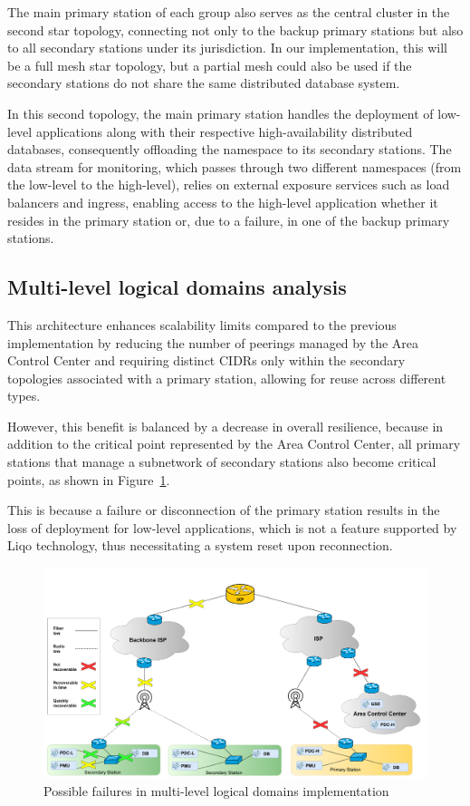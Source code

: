 The main primary station of each group also serves as the central cluster in the second star topology, connecting not only to the backup primary stations but also to all secondary stations under its jurisdiction. In our implementation, this will be a full mesh star topology, but a partial mesh could also be used if the secondary stations do not share the same distributed database system.

In this second topology, the main primary station handles the deployment of low-level applications along with their respective high-availability distributed databases, consequently offloading the namespace to its secondary stations. The data stream for monitoring, which passes through two different namespaces (from the low-level to the high-level), relies on external exposure services such as load balancers and ingress, enabling access to the high-level application whether it resides in the primary station or, due to a failure, in one of the backup primary stations.


\subsection{Multi-level logical domains analysis}

This architecture enhances scalability limits compared to the previous implementation by reducing the number of peerings managed by the Area Control Center and requiring distinct CIDRs only within the secondary topologies associated with a primary station, allowing for reuse across different types.

However, this benefit is balanced by a decrease in overall resilience, because in addition to the critical point represented by the Area Control Center, all primary stations that manage a subnetwork of secondary stations also become critical points, as shown in Figure~\ref{fig:failures2}.

This is because a failure or disconnection of the primary station results in the loss of deployment for low-level applications, which is not a feature supported by Liqo technology, thus necessitating a system reset upon reconnection.

\begin{figure}[ht]\centering
\includegraphics[scale=0.20]{Pictures/failures2}
\caption{Possible failures in multi-level logical domains implementation}\label{fig:failures2}
\end{figure}

